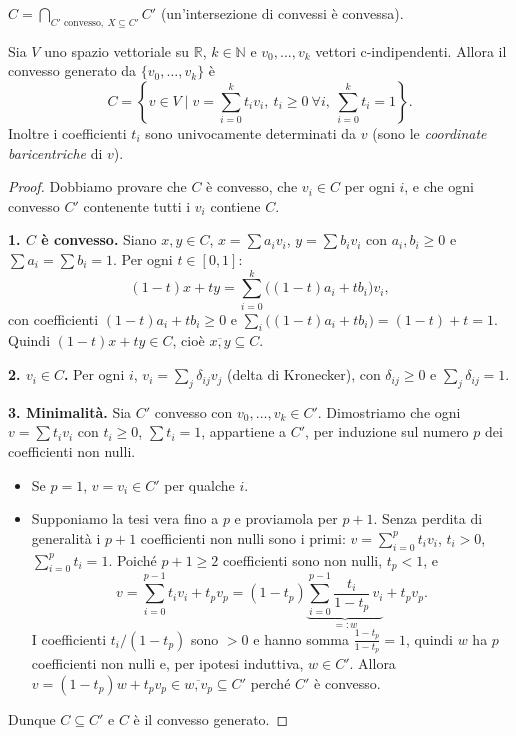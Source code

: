 \begin{observacion}
$C = \bigcap_{C' \text{ convesso},\ X \subseteq C'} C'$ (un'intersezione di convessi \`e convessa).
\end{observacion}

\begin{teo}
Sia $V$ uno spazio vettoriale su $\mathbb{R}$, $k \in \mathbb{N}$ e $v_0, \dots, v_k$ vettori c-indipendenti. Allora il convesso generato da $\{v_0, \dots, v_k\}$ \`e
\[
C = \left\{ v \in V \;\Big|\; v = \sum_{i=0}^k t_i v_i,\ t_i \geqslant 0\ \forall i,\ \sum_{i=0}^k t_i = 1 \right\}.
\]
Inoltre i coefficienti $t_i$ sono univocamente determinati da $v$ (sono le \emph{coordinate baricentriche} di $v$).
\end{teo}

\begin{proof}
Dobbiamo provare che $C$ \`e convesso, che $v_i \in C$ per ogni $i$, e che ogni convesso $C'$ contenente tutti i $v_i$ contiene $C$.

\medskip
\textbf{1. $C$ \`e convesso.} Siano $x, y \in C$, $x = \sum a_i v_i$, $y = \sum b_i v_i$ con $a_i, b_i \geqslant 0$ e $\sum a_i = \sum b_i = 1$. Per ogni $t \in [0,1]$:
\[
(1-t)x + ty = \sum_{i=0}^k \big( (1-t)a_i + t b_i \big) v_i,
\]
con coefficienti $(1-t)a_i + tb_i \geqslant 0$ e $\sum_i \big((1-t)a_i + tb_i\big) = (1-t) + t = 1$. Quindi $(1-t)x + ty \in C$, cio\`e $\overline{x,y} \subseteq C$.

\textbf{2. $v_i \in C$.} Per ogni $i$, $v_i = \sum_j \delta_{ij} v_j$ (delta di Kronecker), con $\delta_{ij} \geqslant 0$ e $\sum_j \delta_{ij} = 1$.

\textbf{3. Minimalit\`a.} Sia $C'$ convesso con $v_0, \dots, v_k \in C'$. Dimostriamo che ogni $v = \sum t_i v_i$ con $t_i \geqslant 0$, $\sum t_i = 1$, appartiene a $C'$, per induzione sul numero $p$ dei coefficienti non nulli.
\begin{itemize}
    \item Se $p = 1$, $v = v_i \in C'$ per qualche $i$.
    \item Supponiamo la tesi vera fino a $p$ e proviamola per $p+1$. Senza perdita di generalit\`a i $p+1$ coefficienti non nulli sono i primi: $v = \sum_{i=0}^{p} t_i v_i$, $t_i > 0$, $\sum_{i=0}^p t_i = 1$. Poich\'e $p+1 \geqslant 2$ coefficienti sono non nulli, $t_p < 1$, e
    \[
    v = \sum_{i=0}^{p-1} t_i v_i + t_p v_p = (1 - t_p) \underbrace{\sum_{i=0}^{p-1} \frac{t_i}{1 - t_p}\, v_i}_{=: w} + t_p v_p .
    \]
    I coefficienti $t_i/(1-t_p)$ sono $> 0$ e hanno somma $\frac{1-t_p}{1-t_p} = 1$, quindi $w$ ha $p$ coefficienti non nulli e, per ipotesi induttiva, $w \in C'$. Allora $v = (1-t_p)w + t_p v_p \in \overline{w, v_p} \subseteq C'$ perch\'e $C'$ \`e convesso.
\end{itemize}
Dunque $C \subseteq C'$ e $C$ \`e il convesso generato.


\end{proof}
